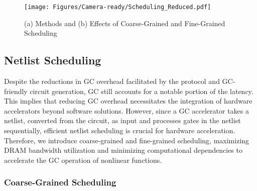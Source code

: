    
\begin{figure*}[t]
    \vspace{-0.2in}
    \centering
    \texttt{[image: Figures/Camera-ready/Scheduling\_Reduced.pdf]}
    \caption{(a) Methods and (b) Effects of Coarse-Grained and Fine-Grained Scheduling}
    \vspace{-0.2in}
    \label{fig:scheduling}
\end{figure*}
\subsection{Netlist Scheduling}
Despite the reductions in GC overhead facilitated by the \sysname protocol and GC-friendly circuit generation, GC still accounts for a notable portion of the latency. This implies that reducing GC overhead necessitates the integration of hardware accelerators beyond software solutions.
However, since a GC accelerator takes a netlist, converted from the circuit, as input and processes gates in the netlist sequentially, efficient netlist scheduling is crucial for hardware acceleration. Therefore, we introduce coarse-grained and fine-grained scheduling, maximizing DRAM bandwidth utilization and minimizing computational dependencies to accelerate the GC operation of nonlinear functions. 


\subsubsection{\textbf{Coarse-Grained Scheduling}}

